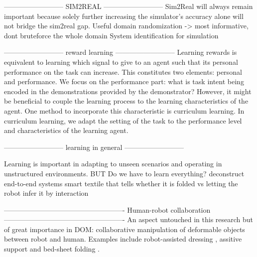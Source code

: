 \documentclass[\home/main.tex]{subfiles}
\begin{document}
--------------------------
    SIM2REAL
--------------------------
Sim2Real will always remain important because solely further increasing the simulator's accuracy alone will not bridge the sim2real gap.
Useful domain randomization -> most informative, dont bruteforce the whole domain 
System identification for simulation 

--------------------------
    reward learning
--------------------------
Learning rewards is equivalent to learning which signal to give to an agent such that its personal performance on the task can increase. This constitutes two elements: personal and performance. We focus on the performance part: what is task intent being encoded in the demonstrations provided by the demonstrator? However, it might be beneficial to couple the learning process to the learning characteristics of the agent. One method to incorporate this characteristic is curriculum learning. In curriculum learning, we adapt the setting of the task to the performance level and characteristics of the learning agent.  

--------------------------
    learning in general
--------------------------

Learning is important in adapting to unseen scenarios and operating in unstructured environments. 
BUT
Do we have to learn everything?
    deconstruct end-to-end systems
    smart textile that tells whether it is folded vs letting the robot infer it by interaction 


 ----------------------------------------------------
    Human-robot collaboration
----------------------------------------------------
An aspect untouched in this research but of great importance in DOM: collaborative manipulation of deformable objects between robot and human. Examples include robot-assisted dressing \autocite{Gao2016}, assitive support \autocite{lu2017human} and bed-sheet folding \autocite{Kruse2015}.
\end{document}

